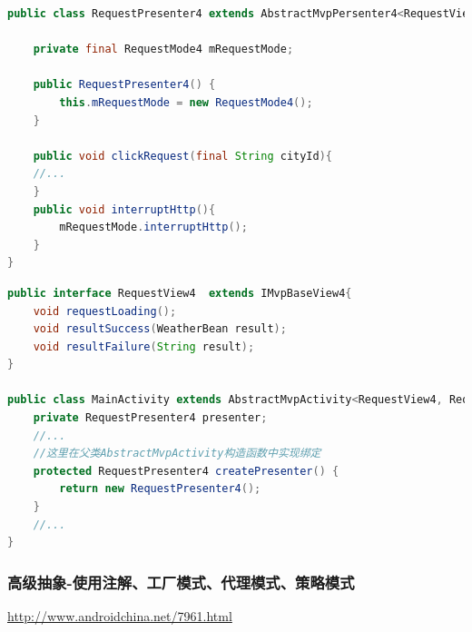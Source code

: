 \documentclass[a4paper,12pt]{ctexart}
\begin{document}
\begin{lstlisting}[language=java]
public class RequestPresenter4 extends AbstractMvpPersenter4<RequestView4> {

	private final RequestMode4 mRequestMode;
	
	public RequestPresenter4() {
		this.mRequestMode = new RequestMode4();
	}
	
	public void clickRequest(final String cityId){
	//...
	}
	public void interruptHttp(){
		mRequestMode.interruptHttp();
	}
}
\end{lstlisting}
\begin{lstlisting}[language=java]
public interface RequestView4  extends IMvpBaseView4{
	void requestLoading();
	void resultSuccess(WeatherBean result);
	void resultFailure(String result);
}

public class MainActivity extends AbstractMvpActivity<RequestView4, RequestPresenter4> implements RequestView4 {
	private RequestPresenter4 presenter;
	//...
	//这里在父类AbstractMvpActivity构造函数中实现绑定
	protected RequestPresenter4 createPresenter() {
		return new RequestPresenter4();
	}
	//...
}
\end{lstlisting}
\subsubsection{高级抽象-使用注解、工厂模式、代理模式、策略模式}
\url{http://www.androidchina.net/7961.html}
\end{document}
